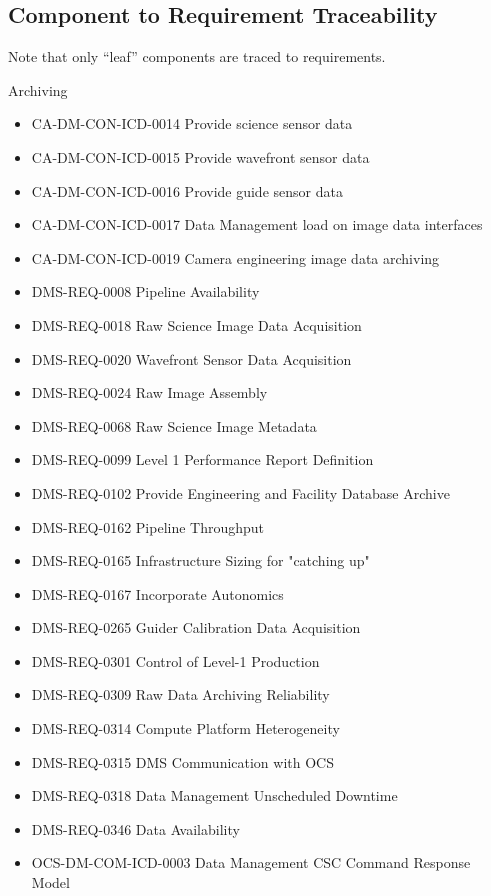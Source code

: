 \subsection{Component to Requirement
Traceability}\label{component-to-requirement-traceability}

Note that only ``leaf'' components are traced to requirements.

\footnotesize

Archiving \begin{itemize}
\item CA-DM-CON-ICD-0014 Provide science sensor data
\item CA-DM-CON-ICD-0015 Provide wavefront sensor data
\item CA-DM-CON-ICD-0016 Provide guide sensor data
\item CA-DM-CON-ICD-0017 Data Management load on image data interfaces
\item CA-DM-CON-ICD-0019 Camera engineering image data archiving
\item DMS-REQ-0008 Pipeline Availability
\item DMS-REQ-0018 Raw Science Image Data Acquisition
\item DMS-REQ-0020 Wavefront Sensor Data Acquisition
\item DMS-REQ-0024 Raw Image Assembly
\item DMS-REQ-0068 Raw Science Image Metadata
\item DMS-REQ-0099 Level 1 Performance Report Definition
\item DMS-REQ-0102 Provide Engineering and Facility Database Archive
\item DMS-REQ-0162 Pipeline Throughput
\item DMS-REQ-0165 Infrastructure Sizing for "catching up"
\item DMS-REQ-0167 Incorporate Autonomics
\item DMS-REQ-0265 Guider Calibration Data Acquisition
\item DMS-REQ-0301 Control of Level-1 Production
\item DMS-REQ-0309 Raw Data Archiving Reliability
\item DMS-REQ-0314 Compute Platform Heterogeneity
\item DMS-REQ-0315 DMS Communication with OCS
\item DMS-REQ-0318 Data Management Unscheduled Downtime
\item DMS-REQ-0346 Data Availability
\item OCS-DM-COM-ICD-0003 Data Management CSC Command Response Model

\end{itemize}
